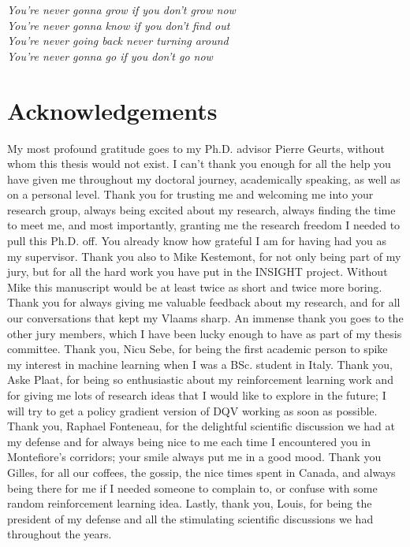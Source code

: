 

\begin{flushright}{\slshape    
You're never gonna grow if you don't grow now \\
You're never gonna know if you don't find out \\
You're never going back never turning around \\
You're never gonna go if you don't go now \\
}
\end{flushright}

\bigskip


\begingroup

\let\clearpage\relax
\let\cleardoublepage\relax
\let\cleardoublepage\relax

\chapter*{Acknowledgements}

\noindent

My most profound gratitude goes to my Ph.D. advisor Pierre Geurts, without whom this thesis would not exist. I can't thank you enough for all the help you have given me throughout my doctoral journey, academically speaking, as well as on a personal level. Thank you for trusting me and welcoming me into your research group, always being excited about my research, always finding the time to meet me, and most importantly, granting me the research freedom I needed to pull this Ph.D. off. You already know how grateful I am for having had you as my supervisor. Thank you also to Mike Kestemont, for not only being part of my jury, but for all the hard work you have put in the INSIGHT project. Without Mike this manuscript would be at least twice as short and twice more boring. Thank you for always giving me valuable feedback about my research, and for all our conversations that kept my Vlaams sharp. An immense thank you goes to the other jury members, which I have been lucky enough to have as part of my thesis committee. Thank you, Nicu Sebe, for being the first academic person to spike my interest in machine learning when I was a BSc. student in Italy. Thank you, Aske Plaat, for being so enthusiastic about my reinforcement learning work and for giving me lots of research ideas that I would like to explore in the future; I will try to get a policy gradient version of DQV working as soon as possible. Thank you, Raphael Fonteneau, for the delightful scientific discussion we had at my defense and for always being nice to me each time I encountered you in Montefiore's corridors; your smile always put me in a good mood. Thank you Gilles, for all our coffees, the gossip, the nice times spent in Canada, and always being there for me if I needed someone to complain to, or confuse with some random reinforcement learning idea. Lastly, thank you, Louis, for being the president of my defense and all the stimulating scientific discussions we had throughout the years.     

